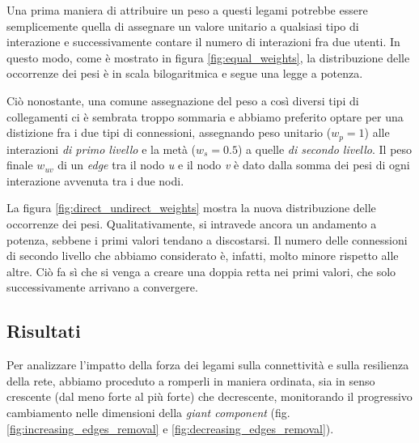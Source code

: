     Una prima maniera di attribuire un peso a questi legami potrebbe essere semplicemente quella di assegnare un valore unitario a qualsiasi tipo di interazione e successivamente contare il numero di interazioni fra due utenti. In questo modo, come è mostrato in figura \ref{fig:equal_weights}, la distribuzione delle occorrenze dei pesi è in scala bilogaritmica e segue una legge a potenza.

    Ciò nonostante, una comune assegnazione del peso a così diversi tipi di collegamenti ci è sembrata troppo sommaria e abbiamo preferito optare per una distizione fra i due tipi di connessioni, assegnando peso unitario ($w_{p} = 1$) alle interazioni \textit{di primo livello} e la metà ($w_{s} = 0.5$) a quelle \textit{di secondo livello}. Il peso finale $w_{uv}$ di un \textit{edge} tra il nodo \textit{u} e il nodo \textit{v} è dato dalla somma dei pesi di ogni interazione avvenuta tra i due nodi.  
    
    La figura \ref{fig:direct_undirect_weights} mostra la nuova distribuzione delle occorrenze dei pesi. Qualitativamente, si intravede ancora un andamento a potenza, sebbene i primi valori tendano a discostarsi. Il numero delle connessioni di secondo livello che abbiamo considerato è, infatti, molto minore rispetto alle altre. Ciò fa sì che si venga a creare una doppia retta nei primi valori, che solo successivamente arrivano a convergere.

    \subsection{Risultati}
    
    Per analizzare l’impatto della forza dei legami sulla connettività e sulla resilienza della rete, abbiamo proceduto a romperli in maniera ordinata, sia in senso crescente (dal meno forte al più forte) che decrescente, monitorando il progressivo cambiamento nelle dimensioni della \textit{giant component} (fig. \ref{fig:increasing_edges_removal} e \ref{fig:decreasing_edges_removal}).
    
